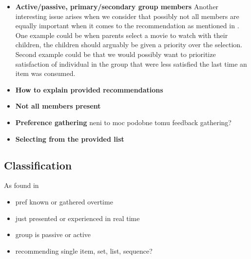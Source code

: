 \begin{itemize}
    \item \textbf{Active/passive, primary/secondary group members} \newline
        Another interesting issue arises when we consider that possibly not all members are equally important when it comes to the recommendation as mentioned in \cite{deCampos_2009_managing_uncertanity_in_grouprec}. One example could be when parents select a movie to watch with their children, the children should arguably be given a priority over the selection. Second example could be that we would possibly want to prioritize satisfaction of individual in the group that were less satisfied the last time an item was consumed.
        
    \item \textbf{How to explain provided recommendations} \newline
    
    \item \textbf{Not all members present} \newline
    \item \textbf{Preference gathering} \newline
    neni to moc podobne tomu feedback gathering?
    \item \textbf{Selecting from the provided list} \newline
\end{itemize}


\subsection{Classification}
As found in \cite{masthoff_2011_group_rec_systems}
\begin{itemize}
    \item pref known or gathered overtime
    \item just presented or experienced in real time
    \item group is passive or active 
    \item recommending single item, set, list, sequence?
\end{itemize}


